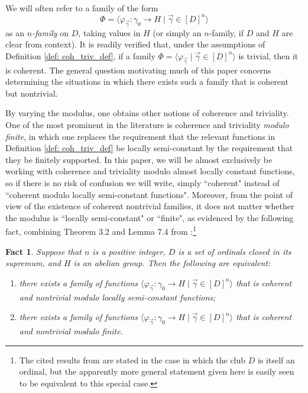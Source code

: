 \documentclass{amsart}
\numberwithin{theorem}{section}
\newtheorem{fact}[theorem]{Fact}
\theoremstyle{definition}
\newcommand{\ra}{\rightarrow}
\begin{document}
We will often refer to a family of the form 
\[
    \Phi = \langle \varphi_{\vec{\gamma}}:\gamma_0 \ra H \mid \vec{\gamma} \in 
    [D]^n \rangle
\]
as an \emph{$n$-family} on $D$, taking values in $H$ (or simply an $n$-family, if 
$D$ and $H$ are clear from context).
It is readily verified that, under the assumptions of Definition 
\ref{def: coh_triv_def}, if a family $\Phi = \langle \varphi_{\vec{\gamma}} 
\mid \vec{\gamma} \in [D]^n \rangle$ is trivial, then it is coherent. 
The general question motivating much of this paper concerns determining 
the situations in which there exists such a family that is coherent but 
nontrivial.


By varying the modulus, one obtains other notions of coherence and triviality. 
One of the most prominent in the literature is coherence and triviality 
\emph{modulo finite}, in which one replaces the requirement that the relevant 
functions in Definition \ref{def: coh_triv_def} be locally semi-constant by 
the requirement that they be finitely supported. In this paper, we will be 
almost exclusively be working with coherence and triviality modulo almost 
locally constant functions, so if there is no risk of confusion we will 
write, simply ``coherent" instead of ``coherent modulo locally semi-constant 
functions". Moreover, from the point of view of the existence of coherent 
nontrivial families, it does not matter whether the modulus is ``locally 
semi-constant" or ``finite", as evidenced by the following fact, 
combining Theorem 3.2 and Lemma 7.4 from 
\cite{bergfalk2024introductionhigherwalks}:\footnote{The cited results from 
\cite{bergfalk2024introductionhigherwalks} are stated in the case in 
which the club $D$ is itself an ordinal, but the apparently more 
general statement given here is easily seen to be equivalent to this special 
case.}

\begin{fact}
  Suppose that $n$ is a positive integer, $D$ is a set of ordinals closed 
  in its supremum, and 
  $H$ is an abelian group. Then the following are equivalent:
  \begin{enumerate}
    \item there exists a family of functions $\langle \varphi_{\vec{\gamma}} 
    : \gamma_0 \ra H \mid \vec{\gamma} \in [D]^n \rangle$ that is coherent 
    and nontrivial modulo locally semi-constant functions;
    \item there exists a family of functions $\langle \varphi_{\vec{\gamma}} 
    : \gamma_0 \ra H \mid \vec{\gamma} \in [D]^n \rangle$ that is coherent 
    and nontrivial modulo finite.
  \end{enumerate}   
\end{fact}
\end{document}
